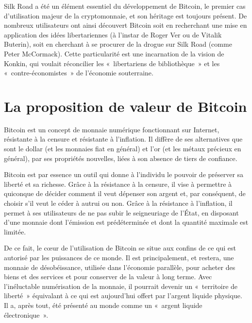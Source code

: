 Silk Road a été un élément essentiel du développement de Bitcoin, le premier cas d'utilisation majeur de la cryptomonnaie, et son héritage est toujours présent. De nombreux utilisateurs ont ainsi découvert Bitcoin soit en recherchant une mise en application des idées libertariennes (à l'instar de Roger Ver ou de Vitalik Buterin), soit en cherchant à se procurer de la drogue sur Silk Road (comme Peter McCormack). Cette particularité est une incarnation de la vision de Konkin, qui voulait réconcilier les «~libertariens de bibliothèque~» et les «~contre-économistes~» de l'économie souterraine.

\section*{La proposition de valeur de Bitcoin}

Bitcoin est un concept de monnaie numérique fonctionnant sur Internet, résistante à la censure et résistante à l'inflation. Il diffère de ses alternatives que sont le dollar (et les monnaies fiat en général) et l'or (et les métaux précieux en général), par ses propriétés nouvelles, liées à son absence de tiers de confiance. 

Bitcoin est par essence un outil qui donne à l'individu le pouvoir de préserver sa liberté et sa richesse. Grâce à la résistance à la censure, il vise à permettre à quiconque de décider comment il veut dépenser son argent et, par conséquent, de choisir s'il veut le céder à autrui ou non. Grâce à la résistance à l'inflation, il permet à ses utilisateurs de ne pas subir le seigneuriage de l'État, en disposant d'une monnaie dont l'émission est prédéterminée et dont la quantité maximale est limitée.

De ce fait, le cœur de l'utilisation de Bitcoin se situe aux confins de ce qui est autorisé par les puissances de ce monde. Il est principalement, et restera, une monnaie de désobéissance, utilisée dans l'économie parallèle, pour acheter des biens et des services et pour conserver de la valeur à long terme. Avec l'inéluctable numérisation de la monnaie, il pourrait devenir un «~territoire de liberté~» équivalant à ce qui est aujourd'hui offert par l'argent liquide physique. Il a, après tout, été présenté au monde comme un «~argent liquide électronique~».
